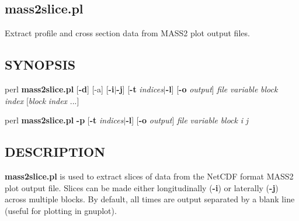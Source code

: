 \subsection{mass2slice.pl\label{mass2slice_pl}}


Extract profile and cross section data from MASS2 plot
output files.

\subsection*{SYNOPSIS\label{mass2slice_pl_SYNOPSIS}}

perl \textbf{mass2slice.pl} [\textbf{-d}] [-a] [\textbf{-i}$|$\textbf{-j}] [\textbf{-t} \textit{indices}$|$\textbf{-l}] [\textbf{-o} \textit{output}]
\textit{file} \textit{variable} \textit{block} \textit{index} [\textit{block} \textit{index} ...]



perl \textbf{mass2slice.pl} \textbf{-p} [\textbf{-t} \textit{indices}$|$\textbf{-l}] [\textbf{-o} \textit{output}]
\textit{file} \textit{variable} \textit{block} \textit{i} \textit{j}

\subsection*{DESCRIPTION\label{mass2slice_pl_DESCRIPTION}}

\textbf{mass2slice.pl} is used to extract slices of data from the NetCDF
format MASS2 plot output file.  Slices can be made either
longitudinally (\textbf{-i}) or laterally (\textbf{-j}) across multiple blocks.
By default, all times are output separated by a blank line (useful for
plotting in gnuplot).

